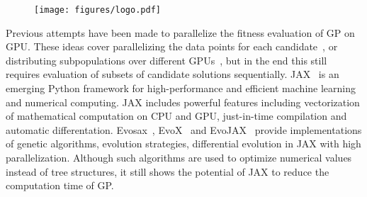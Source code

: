 \documentclass{article}
\begin{document}
\begin{figure}
    \centering
    \texttt{[image: figures/logo.pdf]}
    \vfill
    \label{fig:logo}
\end{figure}

Previous attempts have been made to parallelize the fitness evaluation of GP on GPU. These ideas cover parallelizing the data points for each candidate~\cite{harding2007fast}, or distributing subpopulations over different GPUs~\cite{andre1998parallel, oussaidene1997parallel}, but in the end this still requires evaluation of subsets of candidate solutions sequentially. JAX~\cite{jax2018github} is an emerging Python framework for high-performance and efficient machine learning and numerical computing. JAX includes powerful features including vectorization of mathematical computation on CPU and GPU, just-in-time compilation and automatic differentation. Evosax~\cite{lange2023evosax}, EvoX~\cite{huang2024evox} and EvoJAX~\cite{tang2022evojax} provide implementations of genetic algorithms, evolution strategies, differential evolution in JAX with high parallelization. Although such algorithms are used to optimize numerical values instead of tree structures, it still shows the potential of JAX to reduce the computation time of GP.
\end{document}
